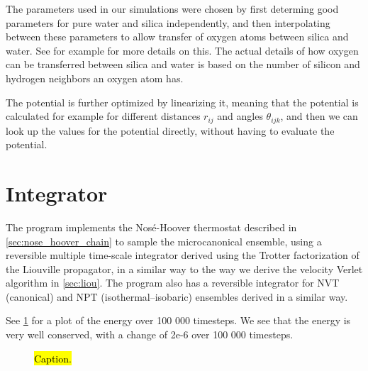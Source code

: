 The parameters used in our simulations were chosen by first determing good parameters for pure water and silica independently, and then interpolating between these parameters to allow transfer of oxygen atoms between silica and water. See for example \cite{vashishta1990interaction} for more details on this. The actual details of how oxygen can be transferred between silica and water is based on the number of silicon and hydrogen neighbors an oxygen atom has.

The potential is further optimized by linearizing it, meaning that the potential is calculated for example for different distances $r_{ij}$ and angles $\theta_{ijk}$, and then we can look up the values for the potential directly, without having to evaluate the potential.


\section{Integrator\label{sec:sio2_integrator}}
%
The program implements the Nos\'e-Hoover thermostat described in \cref{sec:nose_hoover_chain} to sample the microcanonical ensemble, using a reversible multiple time-scale integrator derived using the Trotter factorization of the Liouville propagator\cite{tuckerman1992reversible}, in a similar way to the way we derive the velocity Verlet algorithm in \cref{sec:liou}. The program also has a reversible integrator for NVT (canonical) and NPT (isothermal–isobaric) ensembles\cite{martyna1996explicit} derived in a similar way. 

See \cref{fig:energy_conservation_plot} for a plot of the energy over 100 000 timesteps. We see that the energy is very well conserved, with a change of 2e-6 over 100 000 timesteps.
%
\begin{figure}[!htb]%
    \centering%
    \caption{%
        \hl{Caption.}
        \label{fig:energy_conservation_plot}%
    }%
\end{figure}%

